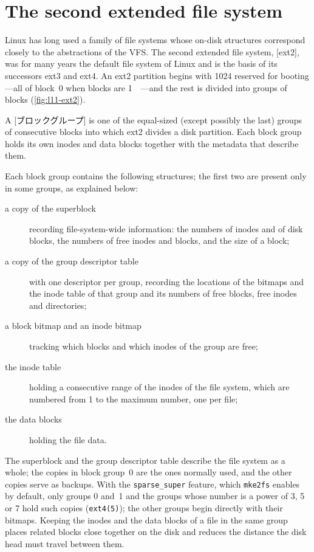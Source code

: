 \documentclass[../main.tex]{subfiles}
\begin{document}
\section{The second extended file system}
\label{sec:l11-ext2}

Linux has long used a family of file systems whose on-disk structures
correspond closely to the abstractions of the VFS.  The second extended file system, [ext2], was
for many years the default file system of Linux and is the basis of its
successors ext3 and ext4.  An ext2 partition begins with \SI{1024}{\byte}
reserved for booting---all of block~0 when blocks are
\SI{1}{\kibi\byte}---and the rest is divided into groups of blocks
(\cref{fig:l11-ext2}).

\begin{definition}
  A [ブロックグループ] is one of the equal-sized (except
  possibly the last) groups of consecutive blocks into which ext2 divides a
  disk partition.  Each block
  group holds its own inodes and data blocks together with the metadata that
  describe them.
\end{definition}

Each block group contains the following structures; the first two are
present only in some groups, as explained below:
\begin{description}
  \item[a copy of the superblock] recording file-system-wide information:
    the numbers of inodes and of disk blocks, the numbers of free inodes and
    blocks, and the size of a block;
  \item[a copy of the group descriptor table] with one descriptor per group,
    recording the locations of the bitmaps and the inode table of that group
    and its numbers of free blocks, free inodes and directories;
  \item[a block bitmap and an inode bitmap] tracking which blocks and which
    inodes of the group are free;
  \item[the inode table] holding a consecutive range of the inodes of the
    file system, which are numbered from 1 to the maximum number, one per
    file;
  \item[the data blocks] holding the file data.
\end{description}
The superblock and the group descriptor table describe the file system as a
whole; the copies in block group~0 are the ones normally used, and the
other copies serve as backups.  With the \texttt{sparse\_super} feature,
which \texttt{mke2fs} enables by default, only groups 0 and~1 and the groups
whose number is a power of 3, 5 or 7 hold such copies (\texttt{ext4(5)});
the other groups begin directly with their bitmaps.  Keeping the inodes and the
data blocks of a file in the same group places related blocks close together
on the disk and reduces the distance the disk head must travel between
them.
\end{document}
